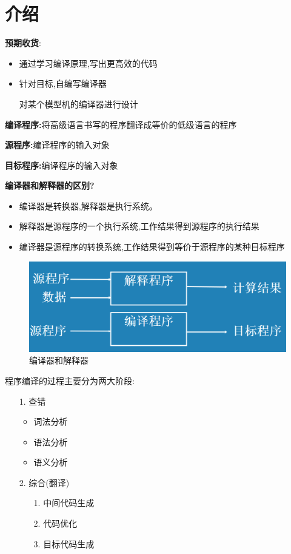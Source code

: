 \section{介绍}

\textbf{预期收货}:
\begin{itemize}
 \item 通过学习编译原理,写出更高效的代码
 \item 针对目标,自编写编译器

       对某个模型机的编译器进行设计
\end{itemize}

\textbf{编译程序:}将高级语言书写的程序翻译成等价的低级语言的程序

\textbf{源程序:}编译程序的输入对象

\textbf{目标程序:}编译程序的输入对象

\textbf{编译器和解释器的区别?}
\begin{itemize}
 \item 编译器是转换器,解释器是执行系统。
 \item 解释器是源程序的一个执行系统,工作结果得到源程序的执行结果
 \item 编译器是源程序的转换系统,工作结果得到等价于源程序的某种目标程序
\end{itemize}

\begin{figure}[H]
 \centering
 \includegraphics[scale = 0.3]{assets/CompilerConstructionPrinciples-part1_8c8c5.png}
 \caption{编译器和解释器}
\end{figure}

\spaceline

程序编译的过程主要分为两大阶段:
\begin{itemize}
 \item [1.] 查错
       \begin{itemize}
        \item 词法分析
        \item 语法分析
        \item 语义分析
       \end{itemize}

 \item [2.] 综合(翻译)
       \begin{itemize}
        \item [1.] 中间代码生成
        \item [2.] 代码优化
        \item [3.] 目标代码生成
       \end{itemize}
\end{itemize}


